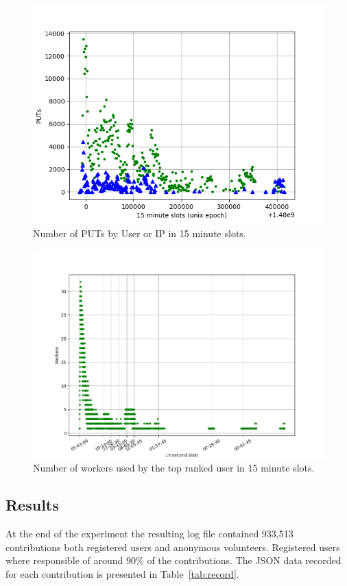 \documentclass{llncs}
\begin{document}
\begin{figure}[htbp]
    \centering
        \includegraphics[width=5in]{img/puts_by_time.png}
    \caption{Number of PUTs by User or IP in 15 minute slots.
    }
    \label{fig:puts-time}
\end{figure}
\begin{figure}[htbp]
    \centering
        \includegraphics[width=5in]{img/workers_best_user.png}
    \caption{ Number of workers used by the top ranked user in 15 minute slots.
    }
    \label{fig:top-user}
\end{figure}

\subsection{Results}
\label{sec:results}
At the end of the experiment the resulting log file contained 933,513 contributions both 
registered users and anonymous volunteers. Registered users where responsible of around
90\% of the contributions. The JSON data recorded for each contribution is  presented 
in Table~\ref{tab:record}.  
\end{document}

